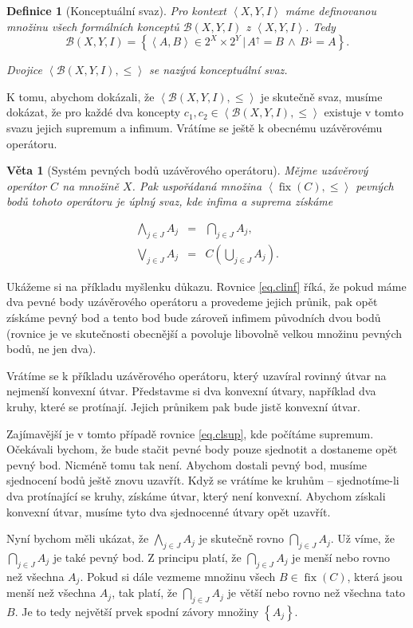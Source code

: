 \documentclass[12pt]{article}
\newcommand{\sep}{\,|\,}
\newcommand{\adds}[1]{\left\{#1\right\}}
\newcommand{\addsp}[1]{\left<#1\right>}
\newcommand{\logand}{\,\wedge\,}
\DeclareMathOperator{\fix}{fix}
\newcommand{\context}{\addsp{X, Y, I}}
\newcommand{\lattice}{\mathcal{B}(X, Y, I)}
\newcommand{\up}{^{\uparrow}}
\newcommand{\down}{^{\downarrow}}
\newcommand{\biginf}{\bigwedge}
\newcommand{\bigsup}{\bigvee}
\newtheorem{mydef}{Definice}
\newtheorem{theorem}{Věta}
\begin{document}
\begin{mydef}[Konceptuální svaz]
Pro kontext $\context$ máme definovanou množinu všech formálních konceptů $\lattice$ z $\context$. Tedy
$$\lattice=\adds{\addsp{A, B}\in 2^X\times 2^Y\sep A\up=B\logand B\down=A}.$$

Dvojice $\addsp{\lattice, \le}$ se nazývá konceptuální svaz. 
\end{mydef}

K tomu, abychom dokázali, že $\addsp{\lattice, \le}$ je skutečně svaz, musíme dokázat, že pro každé dva koncepty $c_1, c_2\in\addsp{\lattice, \le}$ existuje v tomto svazu jejich supremum a infimum. Vrátíme se ještě k obecnému uzávěrovému operátoru. 

\begin{theorem}[Systém pevných bodů uzávěrového operátoru]\label{th.sysfix}
Mějme uzávěrový operátor $C$ na množině $X$. Pak uspořádaná množina $\addsp{\fix(C), \le}$ pevných bodů tohoto operátoru je úplný svaz, kde infima a suprema získáme

\begin{eqnarray}
\biginf_{j\in J}A_j&=&\bigcap_{j\in J}A_j,\label{eq.clinf}\\
\bigsup_{j\in J}A_j&=&C(\bigcup_{j\in J}A_j).\label{eq.clsup}
\end{eqnarray}
\end{theorem}

Ukážeme si na příkladu myšlenku důkazu. Rovnice \ref{eq.clinf} říká, že pokud máme dva pevné body uzávěrového operátoru a provedeme jejich průnik, pak opět získáme pevný bod a tento bod bude zároveň infimem původních dvou bodů (rovnice je ve skutečnosti obecnější a povoluje libovolně velkou množinu pevných bodů, ne jen dva).

Vrátíme se k příkladu uzávěrového operátoru, který uzavíral rovinný útvar na nejmenší konvexní útvar. Představme si dva konvexní útvary, například dva kruhy, které se protínají. Jejich průnikem pak bude jistě konvexní útvar. 

Zajímavější je v tomto případě rovnice \ref{eq.clsup}, kde počítáme supremum. Očekávali bychom, že bude stačit pevné body pouze sjednotit a dostaneme opět pevný bod. Nicméně tomu tak není. Abychom dostali pevný bod, musíme sjednocení bodů ještě znovu uzavřít. Když se vrátíme ke kruhům -- sjednotíme-li dva protínající se kruhy, získáme útvar, který není konvexní. Abychom získali konvexní útvar, musíme tyto dva sjednocenné útvary opět uzavřít. 

Nyní bychom měli ukázat, že $\biginf_{j\in J}A_j$ je skutečně rovno $\bigcap_{j\in J}A_j$. Už víme, že $\bigcap_{j\in J}A_j$ je také pevný bod. Z principu platí, že $\bigcap_{j\in J}A_j$ je menší nebo rovno než všechna $A_j$. Pokud si dále vezmeme množinu všech $B\in\fix(C)$, která jsou menší než všechna $A_j$, tak platí, že $\bigcap_{j\in J}A_j$ je větší nebo rovno než všechna tato $B$. Je to tedy největší prvek spodní závory množiny $\adds{A_j}$. 
\end{document}
